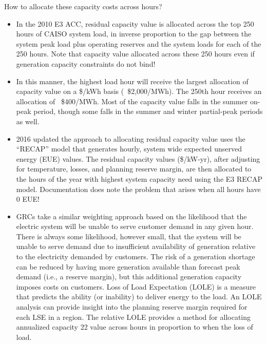 \documentclass[11pt]{article}
\begin{document}
How to allocate these capacity costs across hours?

\begin{itemize}

\item 	In the 2010 E3 ACC, residual capacity value is allocated across the top 250 hours of CAISO system load, in inverse proportion to the gap between the system peak load plus operating reserves and the system loads for each of the 250 hours.  Note that capacity value allocated across these 250 hours even if generation capacity constraints do not bind!

\item 	In this manner, the highest load hour will receive the largest allocation of capacity value on a \$/kWh basis (~\$2,000/MWh). The 250th hour receives an allocation of ~\$400/MWh.  Most of the capacity value falls in the summer on-peak period, though some falls in the summer and winter partial-peak periods as well.    

\item 	2016 updated the approach to allocating residual capacity value uses the “RECAP” model that generates hourly, system wide expected unserved energy (EUE) values.  The residual  capacity values (\$/kW-yr), after adjusting for temperature, losses, and planning reserve margin, are then allocated to the hours of the year with highest system capacity need using the E3 RECAP model. Documentation does note the problem that arises when all hours have 0 EUE!

\item GRCs take a similar weighting approach based on the likelihood that the electric system will be unable to serve customer demand in any given hour. There is always some likelihood, however small, that the system will be unable to serve demand due to insufficient availability of generation relative to the electricity demanded by customers. The risk of a generation shortage can be reduced by having more generation available than forecast peak demand (i.e., a reserve margin), but this additional generation capacity imposes costs on customers. Loss of Load Expectation (LOLE) is a measure that predicts the ability (or inability) to deliver energy to the load. An LOLE analysis can provide insight into the planning reserve margin required for each LSE in a region. The relative LOLE provides a method for allocating annualized capacity 22 value across hours in proportion to when the loss of load. 

\end{itemize}
\end{document}
